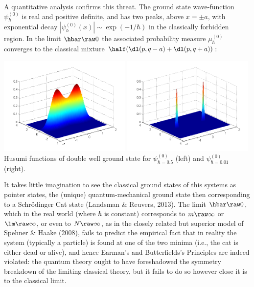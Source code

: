 \documentclass[12pt]{article}
\begin{document}
A quantitative analysis confirms this threat. The ground state wave-function $\psi_{\hbar}^{(0)}$  is  real and positive definite, and has two peaks, above $x=\pm a$, with exponential decay $|\psi_{\hbar}^{(0)}(x)|\sim \exp( -1/\hbar)$ in the classically forbidden region. In the limit $\hbar\raw 0$ the associated probability measure $\mu_{\hbar}^{(0)}$ converges to the classical mixture
$\half(\dl(p,q-a)+\dl(p,q+a))$:
\begin{center}
\includegraphics[width=0.49\textwidth]{KL1H2,hbar=0,5.png}
\includegraphics[width=0.49\textwidth]{KL1H2,hbar=0,01-1.png}
{Husumi functions of double well ground state for $\psi_{\hbar=0.5}^{(0)}$ (left) and  $\psi_{\hbar=0.01}^{(0)}$ (right).}
\end{center}
 It takes little imagination to see the classical ground states of this systems as pointer states, the (unique) quantum-mechanical ground state
then corresponding to a Schr\"{o}dinger Cat state (Landsman \& Reuvers, 2013). The limit $\hbar\raw 0$, which in the real world (where $\hbar$ is constant) corresponds to $m\raw\infty$ or $\lm\raw\infty$, or even to $N\raw\infty$, as in the closely related but superior model of Spehner \& Haake (2008),  fails to predict the empirical fact that in reality the system (typically a particle) is found at one of the two minima (i.e., the cat is either dead or alive), and hence  Earman's and Butterfields's Principles are indeed violated:
the quantum theory ought to have foreshadowed the symmetry breakdown of the limiting classical theory, but it fails to do so however close it is to the classical limit. 
\end{document}
